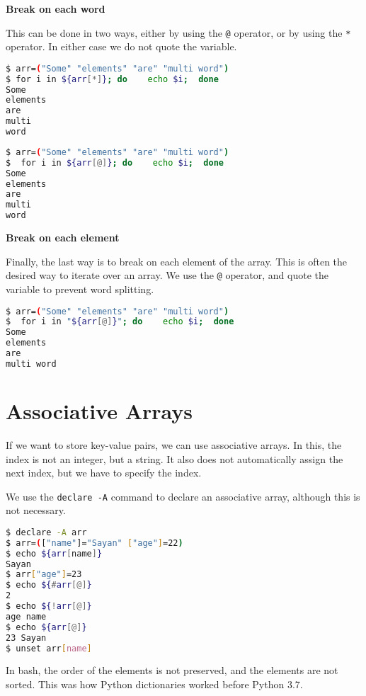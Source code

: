 \textbf{Break on each word}

This can be done in two ways, either by using the \lstinline{@} operator, or by using the \lstinline|*| operator.
In either case we do not quote the variable.

\begin{lstlisting}[language=bash]
$ arr=("Some" "elements" "are" "multi word")
$ for i in ${arr[*]}; do    echo $i;  done
Some
elements
are
multi
word
\end{lstlisting}

\begin{lstlisting}[language=bash]
$ arr=("Some" "elements" "are" "multi word")
$  for i in ${arr[@]}; do    echo $i;  done
Some
elements
are
multi
word
\end{lstlisting}

\textbf{Break on each element}

Finally, the last way is to break on each element of the array.
This is often the desired way to iterate over an array.
We use the \lstinline{@} operator, and quote the variable to prevent word splitting.

\begin{lstlisting}[language=bash]
$ arr=("Some" "elements" "are" "multi word")
$  for i in "${arr[@]}"; do    echo $i;  done
Some
elements
are
multi word
\end{lstlisting}

\section{Associative Arrays}

If we want to store key-value pairs, we can use associative arrays.
In this, the index is not an integer, but a string.
It also does not automatically assign the next index, but we have to specify the index.

We use the \lstinline{declare -A} command to declare an associative array, although this is not necessary.

\begin{lstlisting}[language=bash]
$ declare -A arr
$ arr=(["name"]="Sayan" ["age"]=22)
$ echo ${arr[name]}
Sayan
$ arr["age"]=23
$ echo ${#arr[@]}
2
$ echo ${!arr[@]}
age name
$ echo ${arr[@]}
23 Sayan
$ unset arr[name]
\end{lstlisting}

In bash, the order of the elements is not preserved, and the elements are not sorted.
This was how Python dictionaries worked before Python 3.7.

